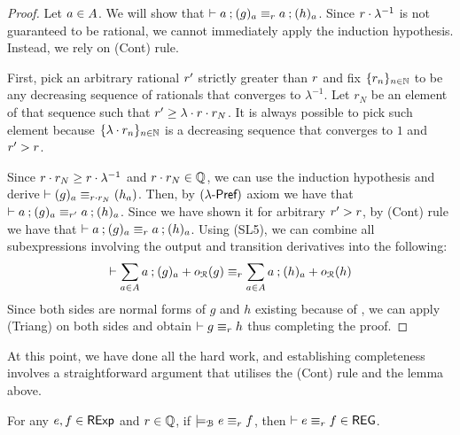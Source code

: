 \begin{proof}
Let $a \in {A}$. We will show that $\vdash a\mathbin{;} (g)_a \equiv_{r} a \mathbin{;} (h)_a $. Since $r \cdot \lambda^{-1}$ is not guaranteed to be rational, we cannot immediately apply the induction hypothesis. Instead, we rely on \textsf{(Cont)} rule. 

First, pick an arbitrary rational $r'$ strictly greater than $r$ and fix $\{r_n\}_{n \in \mathbb{N}}$ to be any decreasing sequence of rationals that converges to $\lambda^{-1}$. Let $r_N$ be an element of that sequence such that $r' \geq \lambda \cdot r \cdot r_N$. It is always possible to pick such element because $\{\lambda \cdot r_n\}_{n \in \mathbb{N}}$ is a decreasing sequence that converges to $1$ and $r' > r$. 

Since $r \cdot r_N \geq r \cdot \lambda^{-1}$ and $r \cdot r_{N} \in \mathbb{Q}$, we can use the induction hypothesis and derive $\vdash (g)_a \equiv_{r \cdot r_{N}} (h_a)$. Then, by $(\textsf{$\lambda$-Pref})$ axiom we have that $\vdash a \mathbin{;} (g)_a \equiv_{r'} a \mathbin{;} (h)_a$. Since we have shown it for arbitrary $r' > r$, by \textsf{(Cont)} rule we have that $\vdash a\mathbin{;} (g)_a \equiv_{r} a \mathbin{;} (h)_a $. Using \textsf{(SL5)}, we can combine all subexpressions involving the output and transition derivatives into the following:
	$$
	\vdash \sum_{a \in {A}} a \mathbin{;} (g)_a + o_{\mathcal{R}}(g) \equiv_{r} \sum_{a \in {A}} a \mathbin{;} (h)_a + o_{\mathcal{R}}(h)
	$$
	Since both sides are normal forms of $g$ and $h$ existing because of , we can apply \textsf{(Triang)} on both sides and obtain $\vdash g \equiv_{r} h$ thus completing the proof.
\end{proof}
At this point, we have done all the hard work, and establishing completeness involves a straightforward argument that utilises the \textsf{(Cont)} rule and the lemma above.
\begin{theorem}[Completeness]\label{c2:completeness}
       For any $e, f \in \mathsf{RExp}$ and $r \in \mathbb{Q}$, if $\models_{\mathcal{B}} e \equiv_r f$, then $\vdash e \equiv_r f \in \mathsf{REG}$.
\end{theorem}
